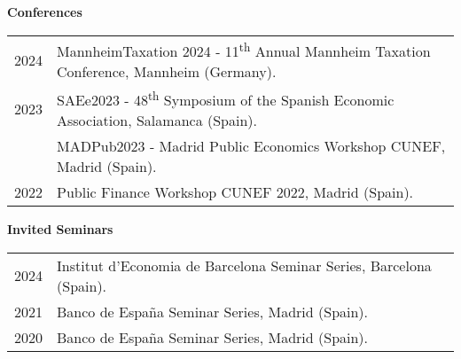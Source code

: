 %
%


\vspace{3 mm}

\textbf{Conferences}

\begin{tabular}{rp{}}
	\textsc{2024}	& MannheimTaxation 2024 - 11\textsuperscript{th} Annual Mannheim Taxation Conference, \faMapMarker \hspace{0.5 mm} Mannheim (Germany). \\	
	\textsc{2023}	& SAEe2023 - 48\textsuperscript{th} Symposium of the Spanish Economic Association, \faMapMarker \hspace{0.5 mm} Salamanca (Spain). \\
	\textsc{}	& MADPub2023 - Madrid Public Economics Workshop CUNEF, \faMapMarker \hspace{0.5 mm} Madrid (Spain). \\
	\textsc{2022}	& Public Finance Workshop CUNEF 2022, \faMapMarker \hspace{0.5 mm} Madrid (Spain). \\
								
\end{tabular}


\textbf{Invited Seminars}

\begin{tabular}{rp{}}
	\textsc{2024}	& Institut d'Economia de Barcelona Seminar Series, \faMapMarker \hspace{0.5 mm} Barcelona (Spain).\\
	\textsc{2021}	& Banco de España Seminar Series, \faMapMarker \hspace{0.5 mm} Madrid (Spain). %
	\\
	\textsc{2020}	& Banco de España Seminar Series, \faMapMarker \hspace{0.5 mm} Madrid (Spain). %
	\\

\end{tabular}


